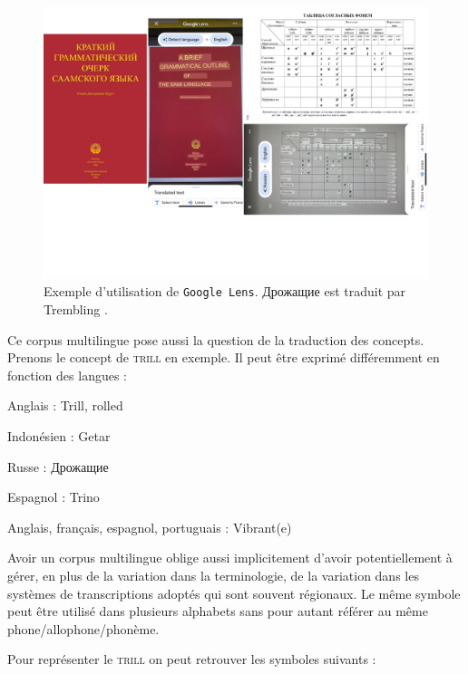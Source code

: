 \begin{figure}
	\centering
	\includegraphics[width=1\linewidth,
	trim={0 5cm 0 0}, clip]{substance/images/CouvGT}
	\caption[Exemple d'utilisation de \texttt{Google Lens}]{Exemple d'utilisation de \texttt{Google Lens}. Дрожащие est traduit par Trembling \parencite{kuruchKratkiyGrammaticheskiyOcherk1985}.}
	\label{fig:couvgt}
\end{figure}


Ce corpus multilingue pose aussi la question de la traduction des concepts. Prenons le concept de \textsc{trill} en exemple. Il peut être exprimé différemment en fonction des langues :

\begin{exe}
	\ex \begin{xlist}
	\item Anglais : Trill, rolled
	\item Indonésien : Getar
	\item Russe : Дрожащие
	\item Espagnol : Trino
	\item Anglais, français, espagnol, portuguais : Vibrant(e)
		\end{xlist}
\end{exe}

Avoir un corpus multilingue oblige aussi implicitement d'avoir potentiellement à gérer, en plus de la variation dans la terminologie, de la variation dans les systèmes de transcriptions adoptés qui sont souvent régionaux. Le même symbole peut être utilisé dans plusieurs alphabets sans pour autant référer au même phone/allophone/phonème.

Pour représenter le \textsc{trill} on peut retrouver les symboles suivants :

